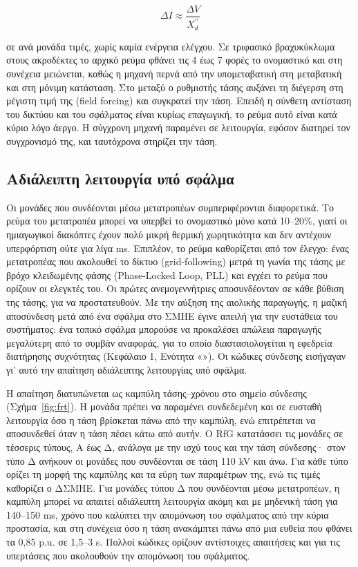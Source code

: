 \begin{equation}
\Delta I \approx \frac{\Delta V}{X_d^{\prime\prime}}
\label{eq:sm-dI}
\end{equation}

σε ανά μονάδα τιμές, χωρίς καμία ενέργεια ελέγχου. Σε τριφασικό βραχυκύκλωμα στους ακροδέκτες
το αρχικό ρεύμα φθάνει τις 4 έως 7 φορές το ονομαστικό και στη συνέχεια μειώνεται, καθώς η
μηχανή περνά από την υπομεταβατική στη μεταβατική και στη μόνιμη κατάσταση. Στο μεταξύ ο
ρυθμιστής τάσης αυξάνει τη διέγερση στη μέγιστη τιμή της (field forcing) και συγκρατεί την
τάση. Επειδή η σύνθετη αντίσταση του δικτύου και του σφάλματος είναι κυρίως επαγωγική, το ρεύμα
αυτό είναι κατά κύριο λόγο άεργο. Η σύγχρονη μηχανή παραμένει σε λειτουργία, εφόσον διατηρεί
τον συγχρονισμό της, και ταυτόχρονα στηρίζει την τάση.

\subsection{Αδιάλειπτη λειτουργία υπό σφάλμα}
\label{sec:frt-req}

Οι μονάδες που συνδέονται μέσω μετατροπέων συμπεριφέρονται διαφορετικά. Το ρεύμα του
μετατροπέα μπορεί να υπερβεί το ονομαστικό μόνο κατά 10--20\%, γιατί οι ημιαγωγικοί διακόπτες
έχουν πολύ μικρή θερμική χωρητικότητα και δεν αντέχουν υπερφόρτιση ούτε για λίγα ms. Επιπλέον,
το ρεύμα καθορίζεται από τον έλεγχο: ένας μετατροπέας που ακολουθεί το δίκτυο (grid-following)
μετρά τη γωνία της τάσης με βρόχο κλειδωμένης φάσης (Phase-Locked Loop, PLL) και εγχέει το
ρεύμα που ορίζουν οι ελεγκτές του. Οι πρώτες ανεμογεννήτριες αποσυνδέονταν σε κάθε βύθιση της
τάσης, για να προστατευθούν. Με την αύξηση της αιολικής παραγωγής, η μαζική αποσύνδεση μετά από
ένα σφάλμα στο ΣΜΗΕ έγινε απειλή για την ευστάθεια του συστήματος: ένα τοπικό
σφάλμα μπορούσε να προκαλέσει απώλεια παραγωγής μεγαλύτερη από το συμβάν αναφοράς, για το οποίο
διαστασιολογείται η εφεδρεία διατήρησης συχνότητας (Κεφάλαιο 1, Ενότητα «»).
Οι κώδικες σύνδεσης εισήγαγαν γι' αυτό την απαίτηση αδιάλειπτης λειτουργίας υπό σφάλμα.

Η απαίτηση διατυπώνεται ως καμπύλη τάσης--χρόνου στο σημείο σύνδεσης (Σχήμα~\ref{fig:frt}).
Η μονάδα πρέπει να παραμένει συνδεδεμένη και σε ευσταθή λειτουργία όσο η τάση βρίσκεται πάνω
από την καμπύλη, ενώ επιτρέπεται να αποσυνδεθεί όταν η τάση πέσει κάτω από αυτήν. Ο RfG
κατατάσσει τις μονάδες σε τέσσερις τύπους, Α έως Δ, ανάλογα με την ισχύ τους και την τάση
σύνδεσης· στον τύπο Δ ανήκουν οι μονάδες που συνδέονται σε τάση 110 kV και άνω. Για κάθε τύπο
ορίζει τη μορφή της καμπύλης και τα εύρη των παραμέτρων της, ενώ τις τιμές καθορίζει ο ΔΣΜΗΕ. Για
μονάδες τύπου Δ που συνδέονται μέσω μετατροπέων, η καμπύλη μπορεί να απαιτεί αδιάλειπτη
λειτουργία ακόμη και με μηδενική τάση για 140--150 ms, χρόνο που καλύπτει την απομόνωση του
σφάλματος από την κύρια προστασία, και στη συνέχεια όσο η τάση ανακάμπτει πάνω από μια ευθεία
που φθάνει τα 0,85 p.u. σε 1,5--3 s. Πολλοί κώδικες ορίζουν αντίστοιχες απαιτήσεις και για τις
υπερτάσεις που ακολουθούν την απομόνωση του σφάλματος.


